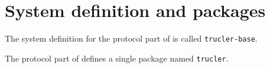 \chapter{System definition and packages}

The \asdf{} system definition for the protocol part of \sysname{} is
called \texttt{trucler-base}.

The protocol part of \sysname{} defines a single package named
\texttt{trucler}.
